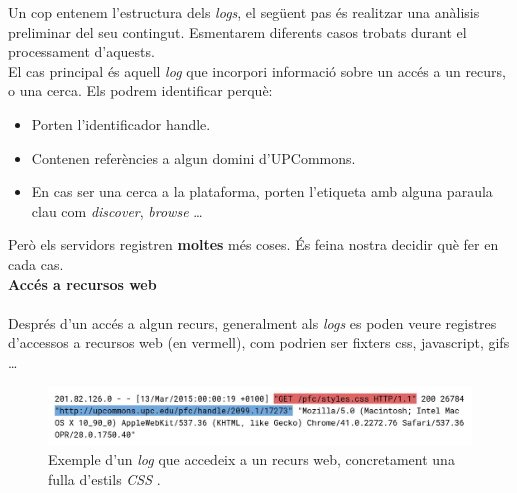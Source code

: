 Un cop entenem l'estructura dels \textit{logs}, el següent pas és realitzar una anàlisis preliminar del seu contingut.
Esmentarem diferents casos trobats durant el processament d'aquests. \\

\noindent
El cas principal és aquell \textit{log} que incorpori informació sobre un accés a un recurs, o una cerca.
Els podrem identificar perquè:

\begin{itemize}
    \item Porten l’identificador \gls{handle}.
    \item Contenen referències a algun domini d’\gls{UPCommons}.
    \item En cas ser una cerca a la plataforma, porten l’etiqueta amb alguna paraula clau com \textit{discover}, \textit{browse} \dots
\end{itemize}

\noindent
Però els servidors registren \textbf{moltes} més coses.
És feina nostra decidir què fer en cada cas. \\

\noindent
\textbf{Accés a recursos web} \\ \\
Després d’un accés a algun recurs, generalment als \textit{logs} es poden veure registres d’accessos a recursos web (en vermell),
com podrien ser fixters css, javascript, gifs …

\begin{figure}[htbp]
    \centerline{\includegraphics[width=\textwidth]{figures/log-web-resource}}
    \captionsetup{justification=centering}
    \caption{Exemple d'un \textit{log} que accedeix a un recurs web, concretament una fulla d'estils \textit{\gls{CSS}} .}\label{fig:log-web-resource}
\end{figure}

%
